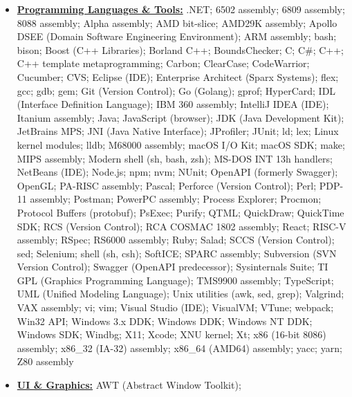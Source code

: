 \documentclass[letterpaper,11pt]{article}
\begin{document}
{\begin{itemize}[leftmargin=0.1in, label={}, itemsep=0pt, parsep=0pt, topsep=0pt, partopsep=0pt]
\item
    \textbf{\underline{Programming Languages \& Tools:}}  \hspace{0pt}
    .NET;
    6502 assembly;
    6809 assembly;
    8088 assembly;
    Alpha assembly;
    AMD bit-slice;
    AMD29K assembly;
    Apollo DSEE (Domain Software Engineering Environment);
    ARM assembly;
    bash;
    bison;
    Boost (C++ Libraries);
    Borland C++;
    BoundsChecker;
    C;
    C\#;
    C++;
    C++ template metaprogramming;
    Carbon;
    ClearCase;
    CodeWarrior;
    Cucumber;
    CVS;
    Eclipse (IDE);
    Enterprise Architect (Sparx Systems);
    flex;
    gcc;
    gdb;
    gem;
    Git (Version Control);
    Go (Golang);
    gprof;
    HyperCard;
    IDL (Interface Definition Language);
    IBM 360 assembly;
    IntelliJ IDEA (IDE);
    Itanium assembly;
    Java;
    JavaScript (browser);
    JDK (Java Development Kit);
    JetBrains MPS;
    JNI (Java Native Interface);
    JProfiler;
    JUnit;
    ld;
    lex;
    Linux kernel modules;
    lldb;
    M68000 assembly;
    macOS I/O Kit;
    macOS SDK;
    make;
    MIPS assembly;
    Modern shell (sh, bash, zsh);
    MS-DOS INT 13h handlers;
    NetBeans (IDE);
    Node.js;
    npm;
    nvm;
    NUnit;
    OpenAPI (formerly Swagger);
    OpenGL;
    PA-RISC assembly;
    Pascal;
    Perforce (Version Control);
    Perl;
    PDP-11 assembly;
    Postman;
    PowerPC assembly;
    Process Explorer;
    Procmon;
    Protocol Buffers (protobuf);
    PsExec;
    Purify;
    QTML;
    QuickDraw;
    QuickTime SDK;
    RCS (Version Control);
    RCA COSMAC 1802 assembly;
    React;
    RISC-V assembly;
    RSpec;
    RS6000 assembly;
    Ruby;
    Salad;
    SCCS (Version Control);
    sed;
    Selenium;
    shell (sh, csh);
    SoftICE;
    SPARC assembly;
    Subversion (SVN Version Control);
    Swagger (OpenAPI predecessor);
    Sysinternals Suite;
    TI GPL (Graphics Programming Language);
    TMS9900 assembly;
    TypeScript;
    UML (Unified Modeling Language);
    Unix utilities (awk, sed, grep);
    Valgrind;
    VAX assembly;
    vi;
    vim;
    Visual Studio (IDE);
    VisualVM;
    VTune;
    webpack;
    Win32 API;
    Windows 3.x DDK;
    Windows DDK;
    Windows NT DDK;
    Windows SDK;
    Windbg;
    X11;
    Xcode;
    XNU kernel;
    Xt;
    x86 (16-bit 8086) assembly;
    x86\_32 (IA-32) assembly;
    x86\_64 (AMD64) assembly;
    yacc;
    yarn;
    Z80 assembly
\item
    \textbf{\underline{UI \& Graphics:}} \hspace{0pt}
    AWT (Abstract Window Toolkit);

\end{itemize}}
\end{document}
